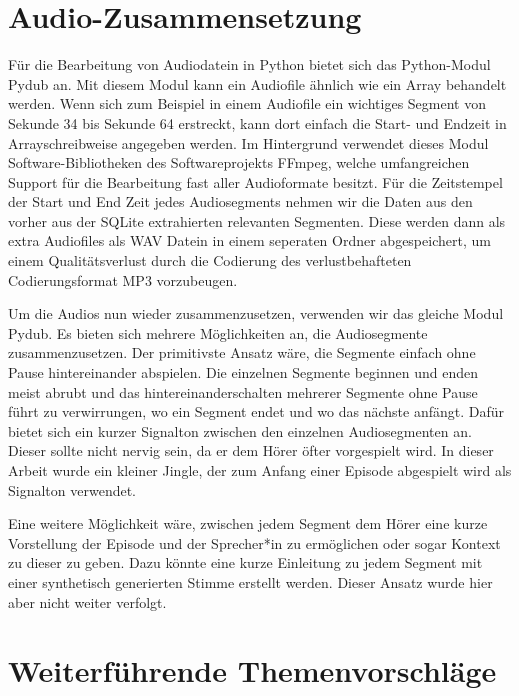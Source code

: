 \section{Audio-Zusammensetzung}


Für die Bearbeitung von Audiodatein in Python bietet sich das Python-Modul Pydub an. 
Mit diesem Modul kann ein Audiofile ähnlich wie ein Array behandelt werden.
Wenn sich zum Beispiel in einem Audiofile ein wichtiges Segment von Sekunde 34 bis Sekunde 64 erstreckt,  kann dort einfach die Start- und Endzeit in Arrayschreibweise angegeben werden.
Im Hintergrund verwendet dieses Modul Software-Bibliotheken des Softwareprojekts FFmpeg, welche umfangreichen Support für die Bearbeitung fast aller Audioformate besitzt.\cite{ffmpeg}
Für die Zeitstempel der Start und End Zeit jedes Audiosegments nehmen wir die Daten aus den vorher aus der SQLite extrahierten relevanten Segmenten.
Diese werden dann als extra Audiofiles als WAV Datein in einem seperaten Ordner abgespeichert, um einem Qualitätsverlust durch die Codierung des verlustbehafteten Codierungsformat MP3 vorzubeugen.

Um die Audios nun wieder zusammenzusetzen, verwenden wir das gleiche Modul Pydub. 
Es bieten sich mehrere Möglichkeiten an, die Audiosegmente zusammenzusetzen. 
Der primitivste Ansatz wäre, die Segmente einfach ohne Pause hintereinander abspielen. 
Die einzelnen Segmente beginnen und enden meist abrubt und das hintereinanderschalten mehrerer Segmente ohne Pause führt zu verwirrungen, wo ein Segment endet und wo das nächste anfängt.
Dafür bietet sich ein kurzer Signalton zwischen den einzelnen Audiosegmenten an. 
Dieser sollte nicht nervig sein, da er dem Hörer öfter vorgespielt wird. 
In dieser Arbeit wurde ein kleiner Jingle, der zum Anfang einer Episode abgespielt wird als Signalton verwendet.

Eine weitere Möglichkeit wäre, zwischen jedem Segment dem Hörer eine kurze Vorstellung der Episode und der Sprecher*in zu ermöglichen oder sogar Kontext zu dieser zu geben. 
Dazu könnte eine kurze Einleitung zu jedem Segment mit einer synthetisch generierten Stimme erstellt werden.
Dieser Ansatz wurde hier aber nicht weiter verfolgt.

\section{Weiterführende Themenvorschläge}


